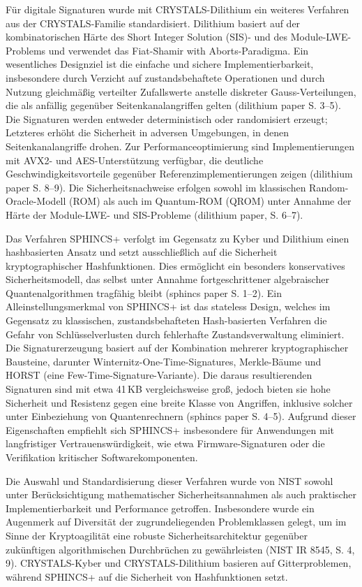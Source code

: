 Für digitale Signaturen wurde mit CRYSTALS-Dilithium ein weiteres Verfahren aus der CRYSTALS-Familie standardisiert. Dilithium basiert auf der kombinatorischen Härte des Short Integer Solution (SIS)- und des Module-LWE-Problems und verwendet das Fiat-Shamir with Aborts-Paradigma. Ein wesentliches Designziel ist die einfache und sichere Implementierbarkeit, insbesondere durch Verzicht auf zustandsbehaftete Operationen und durch Nutzung gleichmäßig verteilter Zufallswerte anstelle diskreter Gauss-Verteilungen, die als anfällig gegenüber Seitenkanalangriffen gelten (dilithium paper S. 3–5). Die Signaturen werden entweder deterministisch oder randomisiert erzeugt; Letzteres erhöht die Sicherheit in adversen Umgebungen, in denen Seitenkanalangriffe drohen. Zur Performanceoptimierung sind Implementierungen mit AVX2- und AES-Unterstützung verfügbar, die deutliche Geschwindigkeitsvorteile gegenüber Referenzimplementierungen zeigen (dilithium paper S. 8–9). Die Sicherheitsnachweise erfolgen sowohl im klassischen Random-Oracle-Modell (ROM) als auch im Quantum-ROM (QROM) unter Annahme der Härte der Module-LWE- und SIS-Probleme (dilithium paper, S. 6–7).

Das Verfahren SPHINCS+ verfolgt im Gegensatz zu Kyber und Dilithium einen hashbasierten Ansatz und setzt ausschließlich auf die Sicherheit kryptographischer Hashfunktionen. Dies ermöglicht ein besonders konservatives Sicherheitsmodell, das selbst unter Annahme fortgeschrittener algebraischer Quantenalgorithmen tragfähig bleibt (sphincs paper S. 1–2). Ein Alleinstellungsmerkmal von SPHINCS+ ist das stateless Design, welches im Gegensatz zu klassischen, zustandsbehafteten Hash-basierten Verfahren die Gefahr von Schlüsselverlusten durch fehlerhafte Zustandsverwaltung eliminiert. Die Signaturerzeugung basiert auf der Kombination mehrerer kryptographischer Bausteine, darunter Winternitz-One-Time-Signatures, Merkle-Bäume und HORST (eine Few-Time-Signature-Variante). Die daraus resultierenden Signaturen sind mit etwa 41 KB vergleichsweise groß, jedoch bieten sie hohe Sicherheit und Resistenz gegen eine breite Klasse von Angriffen, inklusive solcher unter Einbeziehung von Quantenrechnern (sphincs paper S. 4–5). Aufgrund dieser Eigenschaften empfiehlt sich SPHINCS+ insbesondere für Anwendungen mit langfristiger Vertrauenswürdigkeit, wie etwa Firmware-Signaturen oder die Verifikation kritischer Softwarekomponenten.

Die Auswahl und Standardisierung dieser Verfahren wurde von NIST sowohl unter Berücksichtigung mathematischer Sicherheitsannahmen als auch praktischer Implementierbarkeit und Performance getroffen. Insbesondere wurde ein Augenmerk auf Diversität der zugrundeliegenden Problemklassen gelegt, um im Sinne der Kryptoagilität eine robuste Sicherheitsarchitektur gegenüber zukünftigen algorithmischen Durchbrüchen zu gewährleisten (NIST IR 8545, S. 4, 9). CRYSTALS-Kyber und CRYSTALS-Dilithium basieren auf Gitterproblemen, während SPHINCS+ auf die Sicherheit von Hashfunktionen setzt.


